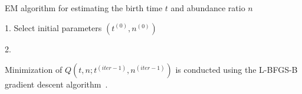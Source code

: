 \documentclass{article}
\begin{document}
 \begin{algorithm}[H]
 \caption{EM algorithm for estimating the birth time $t$ and abundance ratio $n$}
  \label{EM_algorithm}
 1. Select initial parameters $(t^{(0)}, n^{(0)})$ %
 
 2. 
 \end{algorithm}

Minimization of $Q(t,n; t^{(iter-1)},n^{(iter-1)})$ is conducted using the L-BFGS-B gradient descent algorithm~\cite{zhu1997algorithm}.

\end{document}
